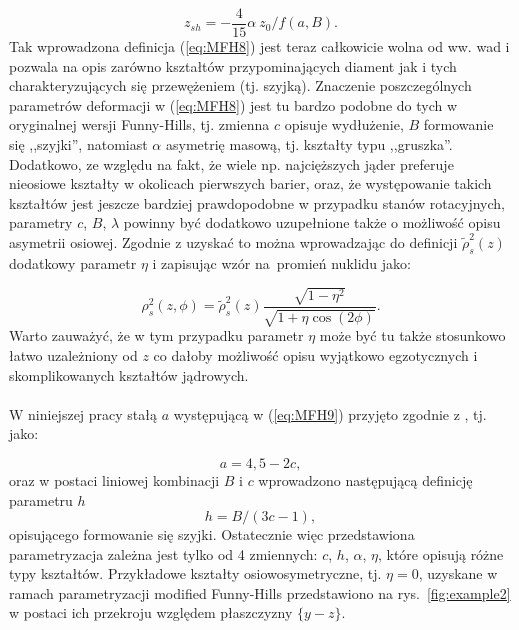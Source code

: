 \documentclass[a4paper,polish]{article}
\numberwithin{equation}{section}
\begin{document}
\begin{equation}
z_{sh}=- \frac{4}{15} \alpha ~ z_0 / f(a,B).
\end{equation}
Tak wprowadzona definicja (\ref{eq:MFH8}) jest teraz całkowicie wolna od ww. wad i pozwala na opis zarówno kształtów przypominających diament jak i tych charakteryzujących się przewężeniem (tj. szyjką). Znaczenie poszczególnych parametrów deformacji w (\ref{eq:MFH8}) jest tu bardzo podobne do tych w oryginalnej wersji Funny-Hills, tj. zmienna $c$ opisuje wydłużenie, $B$ formowanie się ,,szyjki'', natomiast $\alpha$ asymetrię masową, tj. kształty typu ,,gruszka''. Dodatkowo, ze względu na fakt, że wiele np. najcięższych jąder preferuje nieosiowe kształty w okolicach pierwszych barier, oraz, że występowanie takich kształtów jest jeszcze bardziej prawdopodobne w przypadku stanów rotacyjnych, parametry $c$, $B$, $\lambda$ powinny być dodatkowo uzupełnione także o możliwość opisu asymetrii osiowej. Zgodnie z \cite{MFH} uzyskać to można wprowadzając do definicji $\tilde{\rho}^{2}_{s}(z)$ dodatkowy parametr $\eta$ i zapisując wzór na~promień nuklidu jako:

\begin{equation}\label{eq:MFHOST}
{\rho}^{2}_{s}(z,\phi)=\tilde{\rho}^{2}_{s}(z) \frac {\sqrt{1-\eta^2}}{\sqrt{1+\eta \cos(2 \phi)}}.
\end{equation}
Warto zauważyć, że w tym przypadku parametr $\eta$ może być tu także stosunkowo łatwo uzależniony od $z$ co dałoby możliwość opisu wyjątkowo egzotycznych i skomplikowanych kształtów jądrowych. \\\\
W niniejszej pracy stałą $a$ występującą w (\ref{eq:MFH9}) przyjęto  zgodnie z \cite{POM2}, tj. jako: 

\begin{equation}
a=4,5-2c, 
\end{equation}
oraz w postaci liniowej kombinacji $B$ i $c$ wprowadzono następującą definicję parametru $h$ \cite{DOBROW}
\begin{equation}
h=B/(3c-1),
\end{equation}
opisującego formowanie się szyjki. Ostatecznie więc przedstawiona parametryzacja zależna jest tylko od 4 zmiennych: $c$, $h$, $\alpha$, $\eta$, które opisują różne typy kształtów. Przykładowe kształty osiowosymetryczne, tj. $\eta = 0$, uzyskane w ramach parametryzacji modified Funny-Hills przedstawiono na rys.~\ref{fig:example2} w postaci ich przekroju względem płaszczyzny $\{y-z\}$.
\end{document}
